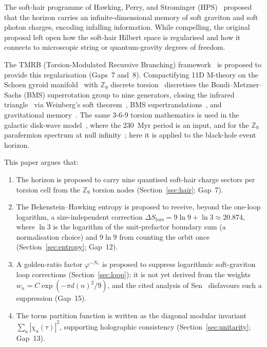 \documentclass[11pt,a4paper]{article}
\begin{document}
The soft-hair programme of Hawking, Perry, and Strominger
(HPS)~\cite{HawkingPerryStrominger2016} proposed that the horizon carries an
infinite-dimensional memory of soft graviton and soft photon charges, encoding
infalling information.  While compelling, the original proposal left open how the
soft-hair Hilbert space is regularised and how it connects to microscopic string or
quantum-gravity degrees of freedom.

The TMRB (Torsion-Modulated Recursive Branching) framework~\cite{BresslerUF2026,BresslerPrismatic2026}
is proposed to provide this regularisation (Gaps~7 and~8).  Compactifying 11D M-theory on the Schoen
gyroid manifold~\cite{Schoen1970} with $\mathbb{Z}_9$ discrete torsion~\cite{BresslerBGL2026}
discretises the Bondi--Metzner--Sachs (BMS) superrotation group to nine generators,
closing the infrared
triangle~\cite{BresslerCH2026} via Weinberg's soft theorem~\cite{Weinberg1965},
BMS supertranslations~\cite{BMS1962,Strominger2014}, and gravitational
memory~\cite{Christodoulou1991,BresslerGP2026}.  The same 3-6-9 torsion
mathematics is used in the galactic disk-wave model~\cite{BresslerGP2026}, where the 230~Myr period is an input, and for the $\mathbb{Z}_9$
parafermion spectrum at null infinity~\cite{GepnerQiu1987,ZamoFateev1987}; here it is applied to the black-hole event horizon.

This paper argues that:
\begin{enumerate}[leftmargin=*, label=\arabic*.]
  \item The horizon is proposed to carry nine quantised soft-hair charge sectors
    per torsion cell from the $\mathbb{Z}_9$ torsion nodes (Section~\ref{sec:hair}; Gap~7).
  \item The Bekenstein--Hawking entropy is proposed to receive, beyond the one-loop logarithm,
    a size-independent correction $\Delta S_{\mathrm{tors}} = 9\ln 9 + \ln 3 \approx 20.874$, where $\ln 3$ is the logarithm of the unit-prefactor boundary sum (a normalisation choice) and $9\ln 9$ from counting the orbit once
    (Section~\ref{sec:entropy}; Gap~12).
  \item A golden-ratio factor $\varphi^{-N_*}$ is proposed to suppress logarithmic
    soft-graviton loop corrections (Section~\ref{sec:loop}); it is not yet derived
    from the weights $w_n = C\exp(-\pi d(n)^2/9)$, and the cited analysis of Sen~\cite{Sen2012} disfavours such a suppression (Gap~15).
  \item The torus partition function is written as the diagonal modular invariant
    $\sum_a|\chi_a(\tau)|^2$, supporting holographic consistency (Section~\ref{sec:unitarity}; Gap~13).
\end{enumerate}
\end{document}
